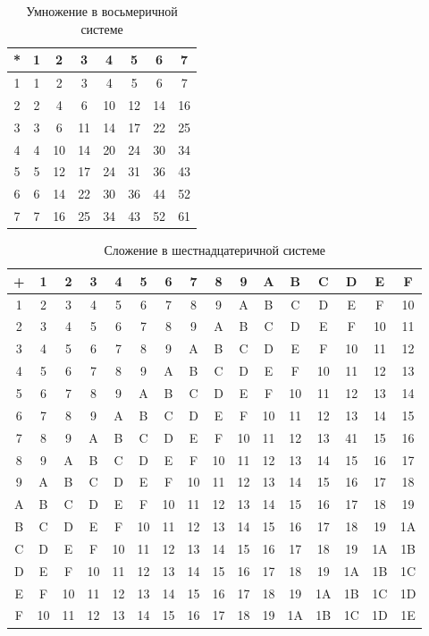 \begin{table}[h]
  \caption{Умножение в восьмеричной системе}
  \begin{center}\label{tab:octmul}
\begin{tabular}{|c|c|c|c|c|c|c|c|}
\hline
{*} & 1 & 2 & 3 & 4 & 5 & 6 & 7\tabularnewline
\hline
1 & 1 & 2 & 3 & 4 & 5 & 6 & 7\tabularnewline
\hline
2 & 2 & 4 & 6 & 10 & 12 & 14 & 16\tabularnewline
\hline
3 & 3 & 6 & 11 & 14 & 17 & 22 & 25\tabularnewline
\hline
4 & 4 & 10 & 14 & 20 & 24 & 30 & 34\tabularnewline
\hline
5 & 5 & 12 & 17 & 24 & 31 & 36 & 43\tabularnewline
\hline
6 & 6 & 14 & 22 & 30 & 36 & 44 & 52\tabularnewline
\hline
7 & 7 & 16 & 25 & 34 & 43 & 52 & 61\tabularnewline
\hline
\end{tabular}
\end{center}
\end{table}

\begin{table}[h!]
  \caption{Сложение в шестнадцатеричной системе}
  \begin{center}\label{tab:hexsum}
\begin{tabular}{|c|c|c|c|c|c|c|c|c|c|c|c|c|c|c|c|}
\hline
+ & 1 & 2 & 3 & 4 & 5 & 6 & 7 & 8 & 9 & A & B & C & D & E & F\tabularnewline
\hline
1 & 2 & 3 & 4 & 5 & 6 & 7 & 8 & 9 & A & B & C & D & E & F & 10\tabularnewline
\hline
2 & 3 & 4 & 5 & 6 & 7 & 8 & 9 & A & B & C & D & E & F & 10 & 11\tabularnewline
\hline
3 & 4 & 5 & 6 & 7 & 8 & 9 & A & B & C & D & E & F & 10 & 11 & 12\tabularnewline
\hline
4 & 5 & 6 & 7 & 8 & 9 & A & B & C & D & E & F & 10 & 11 & 12 & 13\tabularnewline
\hline
5 & 6 & 7 & 8 & 9 & A & B & C & D & E & F & 10 & 11 & 12 & 13 & 14\tabularnewline
\hline
6 & 7 & 8 & 9 & A & B & C & D & E & F & 10 & 11 & 12 & 13 & 14 & 15\tabularnewline
\hline
7 & 8 & 9 & A & B & C & D & E & F & 10 & 11 & 12 & 13 & 41 & 15 & 16\tabularnewline
\hline
8 & 9 & A & B & C & D & E & F & 10 & 11 & 12 & 13 & 14 & 15 & 16 & 17\tabularnewline
\hline
9 & A & B & C & D & E & F & 10 & 11 & 12 & 13 & 14 & 15 & 16 & 17 & 18\tabularnewline
\hline
A & B & C & D & E & F & 10 & 11 & 12 & 13 & 14 & 15 & 16 & 17 & 18 & 19\tabularnewline
\hline
B & C & D & E & F & 10 & 11 & 12 & 13 & 14 & 15 & 16 & 17 & 18 & 19 & 1A\tabularnewline
\hline
C & D & E & F & 10 & 11 & 12 & 13 & 14 & 15 & 16 & 17 & 18 & 19 & 1A & 1B\tabularnewline
\hline
D & E & F & 10 & 11 & 12 & 13 & 14 & 15 & 16 & 17 & 18 & 19 & 1A & 1B & 1C\tabularnewline
\hline
E & F & 10 & 11 & 12 & 13 & 14 & 15 & 16 & 17 & 18 & 19 & 1A & 1B & 1C & 1D\tabularnewline
\hline
F & 10 & 11 & 12 & 13 & 14 & 15 & 16 & 17 & 18 & 19 & 1A & 1B & 1C & 1D & 1E\tabularnewline
\hline
\end{tabular}
\end{center}
\end{table}

